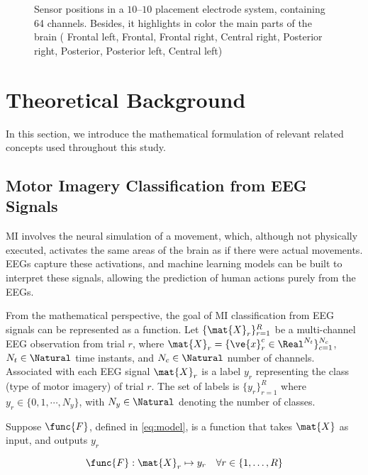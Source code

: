 \begin{figure}[h!]
\centering
        \resizebox{0.4\linewidth}{!}{}
    \caption{Sensor positions in a $10${--}$10$ placement electrode system, containing 64 channels. Besides, it highlights in color the main parts of the brain (  Frontal left,  Frontal,  Frontal right,  Central right,  Posterior right,  Posterior,  Posterior left,  Central left)}
    \label{fig:dataset_sensors}
\end{figure}


\section{Theoretical Background}

In this section, we introduce the mathematical formulation of relevant related concepts used throughout this study.


\subsection{Motor Imagery Classification from EEG Signals}

MI involves the neural simulation of a movement, which, although not physically executed, activates the same areas of the brain as if there were actual movements. EEGs capture these activations, and machine learning models can be built to interpret these signals, allowing the prediction of human actions purely from the EEGs.

From the mathematical perspective, the goal of MI classification from EEG signals can be represented as a function. Let $\{\mat{X}_r\}_{r=1}^{R}$ be a multi-channel EEG observation from trial $r$, where $\mat{X}_r = \{\ve{x}_r^c  \in \Real^{N_t}\}_{c=1}^{N_c} $, $N_t \in \Natural$ time instants, and $N_c \in \Natural$ number of channels. Associated with each EEG signal $\mat{X}_r$ is a label $y_r$ representing the class (type of motor imagery) of trial $r$. The set of labels is $\{y_r\}_{r=1}^{R}$ where $y_r \in \{0, 1, \cdots, N_y\}$, with $N_y \in \Natural$ denoting the number of classes.



Suppose $\func{F}$, defined in \eqref{eq:model}, is a function that takes $\mat{X}$ as input,  and outputs $y_r$

\begin{equation}\label{eq:model}
\func{F}: \mat{X}_r \mapsto y_r \quad \forall r \in \{1, \ldots, R\}    
\end{equation}

